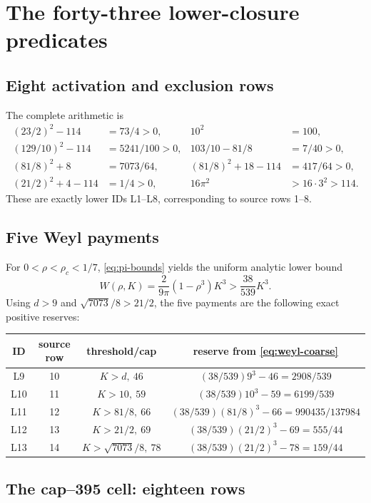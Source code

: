 \documentclass[11pt]{article}
\newcommand{\rc}{\rho _c}
\begin{document}
\section{The forty-three lower-closure predicates}

\subsection{Eight activation and exclusion rows}

The complete arithmetic is
\begin{align*}
 (23/2)^2-114&=73/4>0,&10^2&=100,\\
 (129/10)^2-114&=5241/100>0,
 &103/10-81/8&=7/40>0,\\
 (81/8)^2+8&=7073/64,
 &(81/8)^2+18-114&=417/64>0,\\
 (21/2)^2+4-114&=1/4>0,
 &16\pi^2&>16\cdot3^2>114.
\end{align*}
These are exactly lower IDs L1--L8, corresponding to source rows 1--8.

\subsection{Five Weyl payments}

For \(0<\rho<\rc<1/7\), \eqref{eq:pi-bounds} yields the uniform analytic
lower bound
\begin{equation}
 W(\rho,K)=\frac{2}{9\pi}(1-\rho^3)K^3
 >\frac{38}{539}K^3.
 \label{eq:weyl-coarse}
\end{equation}
Using \(d>9\) and \(\sqrt{7073}/8>21/2\), the five payments are the
following exact positive reserves:
\begin{center}
\begin{tabular}{c|c|c|c}
\toprule
ID&source row&threshold/cap&reserve from \eqref{eq:weyl-coarse}\\
\midrule
L9&10&\(K>d,\ 46\)&\((38/539)9^3-46=2908/539\)\\
L10&11&\(K>10,\ 59\)&\((38/539)10^3-59=6199/539\)\\
L11&12&\(K>81/8,\ 66\)&\((38/539)(81/8)^3-66=990435/137984\)\\
L12&13&\(K>21/2,\ 69\)&\((38/539)(21/2)^3-69=555/44\)\\
L13&14&\(K>\sqrt{7073}/8,\ 78\)&\((38/539)(21/2)^3-78=159/44\)\\
\bottomrule
\end{tabular}
\end{center}

\subsection{The cap--395 cell: eighteen rows}
\end{document}
